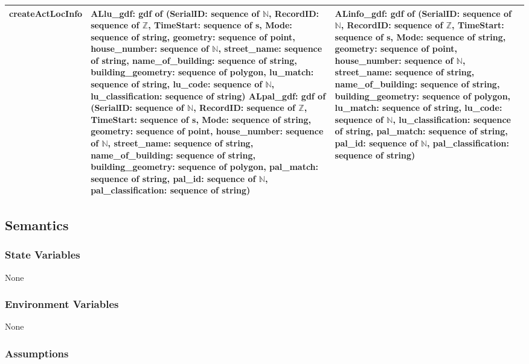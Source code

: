 \documentclass[12pt, titlepage]{article}
\begin{document}
\begin{center}
\begin{longtable}{| l | >{\raggedright}p{5cm} | >{\raggedright}p{4cm} | l |}
createActLocInfo & ALlu\_gdf: gdf of (SerialID: sequence of $\mathbb{N}$, RecordID: sequence of $\mathbb{Z}$, TimeStart: sequence of s, Mode: sequence of string, geometry: sequence of point, house\_number: sequence of $\mathbb{N}$, street\_name: sequence of string, name\_of\_building: sequence of string, building\_geometry: sequence of polygon, lu\_match: sequence of string, lu\_code: sequence of $\mathbb{N}$, lu\_classification: sequence of string) \newline \newline ALpal\_gdf: gdf of (SerialID: sequence of $\mathbb{N}$, RecordID: sequence of $\mathbb{Z}$, TimeStart: sequence of s, Mode: sequence of string, geometry: sequence of point, house\_number: sequence of $\mathbb{N}$, street\_name: sequence of string, name\_of\_building: sequence of string, building\_geometry: sequence of polygon, pal\_match: sequence of string, pal\_id: sequence of $\mathbb{N}$, pal\_classification: sequence of string) & ALinfo\_gdf: gdf of (SerialID: sequence of $\mathbb{N}$, RecordID: sequence of $\mathbb{Z}$, TimeStart: sequence of s, Mode: sequence of string, geometry: sequence of point, house\_number: sequence of $\mathbb{N}$, street\_name: sequence of string, name\_of\_building: sequence of string, building\_geometry: sequence of polygon, lu\_match: sequence of string, lu\_code: sequence of $\mathbb{N}$, lu\_classification: sequence of string, pal\_match: sequence of string, pal\_id: sequence of $\mathbb{N}$, pal\_classification: sequence of string) &\\
\hline
\end{longtable}
\end{center}

\subsection{Semantics}

\subsubsection{State Variables}

None

\subsubsection{Environment Variables}

None

\subsubsection{Assumptions}
\end{document}
